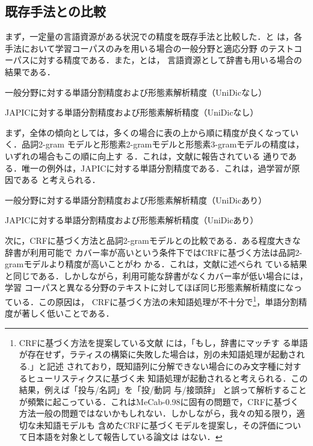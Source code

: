 \documentclass[japanese]{jnlp_1.4}
\def\tabref#1{}
\begin{document}
\subsection{既存手法との比較}

まず，一定量の言語資源がある状況での精度を既存手法と比較した．\tabref{table:L1T1}と
\tabref{table:L1T3}は，各手法において学習コーパスのみを用いる場合の一般分野と適応分野
のテストコーパスに対する精度である．また，\tabref{table:L2T1}と\tabref{table:L2T3}は，
言語資源として辞書も用いる場合の結果である．

\begin{table}[b]
  \caption{一般分野に対する単語分割精度および形態素解析精度（UniDicなし）}

  \label{table:L1T1}
\end{table}
\begin{table}[b]
  \caption{JAPICに対する単語分割精度および形態素解析精度（UniDicなし）}

  \label{table:L1T3}
\end{table}

まず，全体の傾向としては，多くの場合に表の上から順に精度が良くなっていく．品詞2-gram
モデルと形態素2-gramモデルと形態素3-gramモデルの精度は，いずれの場合もこの順に向上す
る．これは，文献\cite{形態素クラスタリングによる形態素解析精度の向上}に報告されている
通りである．唯一の例外は，JAPICに対する単語分割精度である．これは，過学習が原因である
と考えられる．

\begin{table}[t]
  \caption{一般分野に対する単語分割精度および形態素解析精度（UniDicあり）}

  \label{table:L2T1}
\end{table}
\begin{table}[t]
  \caption{JAPICに対する単語分割精度および形態素解析精度（UniDicあり）}

  \label{table:L2T3}
\end{table}

次に，CRFに基づく方法と品詞2-gramモデルとの比較である．ある程度大きな辞書が利用可能で
カバー率が高いという条件下ではCRFに基づく方法は品詞2-gramモデルより精度が高いことがわ
かる．これは，文献\cite{Conditional.Random.Fields.を用いた日本語形態素解析}に述べられ
ている結果と同じである．しかしながら，利用可能な辞書がなくカバー率が低い場合には，学習
コーパスと異なる分野のテキストに対してほぼ同じ形態素解析精度になっている．この原因は，
CRFに基づく方法の未知語処理が不十分で\footnote{CRFに基づく方法を提案している文献
\cite{Conditional.Random.Fields.を用いた日本語形態素解析}には，「もし，辞書にマッチす
る単語が存在せず，ラティスの構築に失敗した場合は，別の未知語処理が起動される.」と記述
されており，既知語列に分解できない場合にのみ文字種に対するヒューリスティクスに基づく未
知語処理が起動されると考えられる．この結果，例えば「投与/名詞」を「投/動詞 与/接頭辞」
と誤って解析することが頻繁に起こっている．これはMeCab-0.98に固有の問題で，CRFに基づく
方法一般の問題ではないかもしれない．しかしながら，我々の知る限り，適切な未知語モデルも
含めたCRFに基づくモデルを提案し，その評価について日本語を対象として報告している論文は
はない．}，単語分割精度が著しく低いことである．
\end{document}
